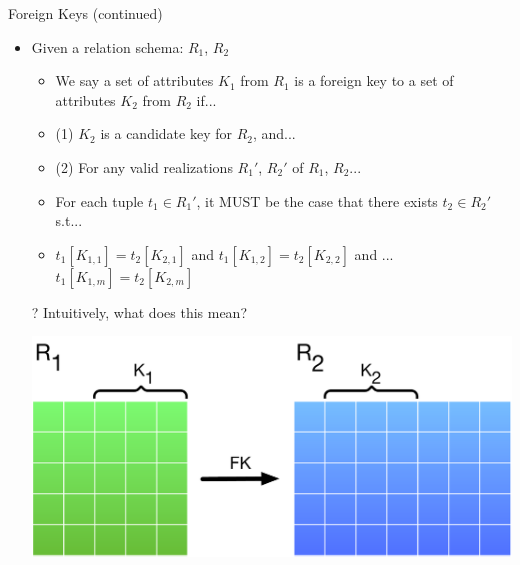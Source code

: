 \documentclass[aspectratio=169]{beamer}
\begin{document}
\begin{frame}{Foreign Keys (continued)}

\begin{itemize}
\item Given a relation schema: $R_1$, $R_2$
	\begin{itemize}
	\item We say a set of attributes $K_1$ from $R_1$ is a foreign key to a set of 
		attributes $K_2$ from $R_2$ if...
	\item (1) $K_2$ is a candidate key for $R_2$, and...
	\item (2) For any valid realizations $R_1'$, $R_2'$ of $R_1$, $R_2$...
	\item For each tuple $t_1 \in R_1'$, it MUST be the case that there exists $t_2 \in R_2'$ s.t...
	\item $t_1[K_{1,1}] = t_2[K_{2,1}]$ and $t_1[K_{1,2}] = t_2[K_{2,2}]$ and ...
                $t_1[K_{1,m}] = t_2[K_{2,m}]$
	\end{itemize}
\item[?] Intuitively, what does this mean?


{\centering\includegraphics[width=.5\textwidth]{./lectRDBMS/fk.pdf}\par}

\end{itemize}
\end{frame}
\end{document}
